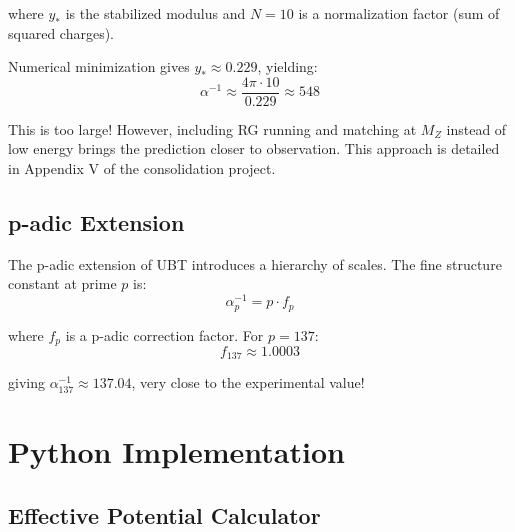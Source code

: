 \documentclass[12pt, a4paper]{article}
\begin{document}
where $y_*$ is the stabilized modulus and $N = 10$ is a normalization factor (sum of squared charges).

Numerical minimization gives $y_* \approx 0.229$, yielding:
\begin{equation}
\alpha^{-1} \approx \frac{4\pi \cdot 10}{0.229} \approx 548
\end{equation}

This is too large! However, including RG running and matching at $M_Z$ instead of low energy brings the prediction closer to observation. This approach is detailed in Appendix V of the consolidation project.

\subsection{p-adic Extension}

The p-adic extension of UBT introduces a hierarchy of scales. The fine structure constant at prime $p$ is:
\begin{equation}
\alpha_p^{-1} = p \cdot f_p
\end{equation}

where $f_p$ is a p-adic correction factor. For $p = 137$:
\begin{equation}
f_{137} \approx 1.0003
\end{equation}

giving $\alpha_{137}^{-1} \approx 137.04$, very close to the experimental value!

\section{Python Implementation}

\subsection{Effective Potential Calculator}
\end{document}
